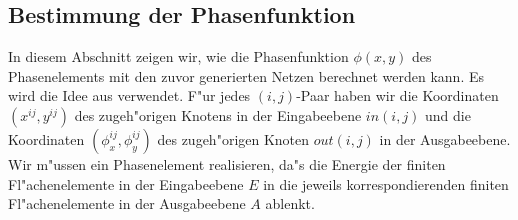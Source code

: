 \documentclass[11pt,a4paper]{article}
\begin{document}
  \subsection{Bestimmung der Phasenfunktion}  
    In diesem Abschnitt zeigen wir, wie die Phasenfunktion $\phi(x,y)$ des Phasenelements mit 
    den zuvor generierten Netzen berechnet werden kann. Es wird die Idee aus \cite{phase} verwendet.
    F"ur jedes $(i,j)$-Paar haben wir die Koordinaten
    $(x^{ij},y^{ij})$ des zugeh"origen Knotens in der Eingabeebene $in(i,j)$ und die Koordinaten 
    $(\phi_x^{ij},\phi_y^{ij})$ des zugeh"origen Knoten $out(i,j)$ in der Ausgabe\-ebene. Wir m"ussen 
    ein Phasenelement realisieren, da"s die Energie der finiten Fl"achenelemente in der Eingabeebene $E$ 
    in die jeweils korrespondierenden finiten Fl"achenelemente in der Ausgabeebene $A$ ablenkt.
\end{document}
